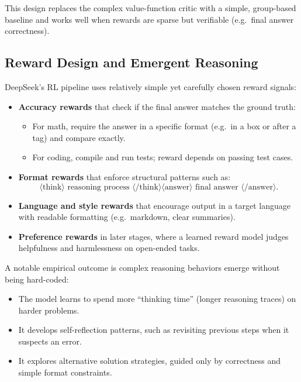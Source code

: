 \documentclass[11pt]{article}
\theoremstyle{remark}
\newcommand{\highlight}[1]{\colorbox{yellow!40}{#1}}
\begin{document}
This design replaces the complex value-function critic with a simple, group-based baseline and works well when \highlight{ rewards are sparse but verifiable (e.g.\ final answer correctness). }

\subsection{Reward Design and Emergent Reasoning}

DeepSeek's RL pipeline uses relatively simple yet carefully chosen reward signals:

\begin{itemize}
  \item \textbf{Accuracy rewards} that check if the final answer matches the ground truth:
  \begin{itemize}
    \item For math, require the answer in a specific format (e.g.\ in a box or after a tag) and compare exactly.
    \item For coding, compile and run tests; reward depends on passing test cases.
  \end{itemize}
  \item \textbf{Format rewards} that enforce \highlight{ structural patterns} such as:
  \[
  \langle\text{think}\rangle \text{ reasoning process } \langle/\text{think}\rangle
  \langle\text{answer}\rangle \text{ final answer } \langle/\text{answer}\rangle.
  \]
  \item \textbf{Language and style rewards} that encourage output in a target language with readable formatting (e.g.\ markdown, clear summaries).
  \item \textbf{Preference rewards} in later stages, where a learned reward model judges helpfulness and harmlessness on open-ended tasks.
\end{itemize}

A notable empirical outcome is  \highlight{complex reasoning behaviors emerge without being hard-coded}:

\begin{itemize}
  \item The model learns to spend more ``thinking time'' (longer reasoning traces) on harder problems.
  \item It develops self-reflection patterns, such as revisiting previous steps when it suspects an error.
  \item It explores alternative solution strategies, guided only by correctness and simple format constraints.
\end{itemize}
\end{document}
